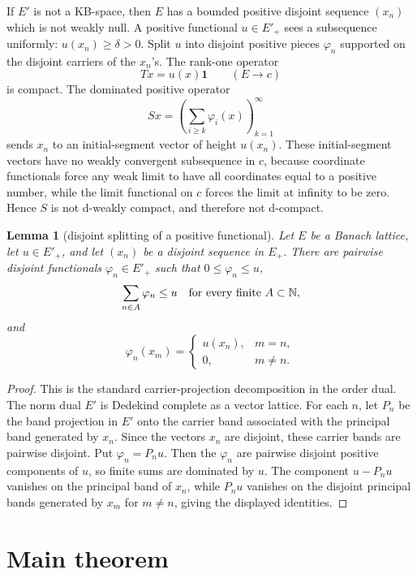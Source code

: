 \documentclass[11pt]{amsart}
\newtheorem{lemma}{Lemma}
\theoremstyle{remark}
\newcommand{\N}{\mathbb N}
\begin{document}
If $E'$ is not a KB-space, then $E$ has a bounded positive disjoint sequence
$(x_n)$ which is not weakly null.  A positive functional $u\in E'_+$ sees a
subsequence uniformly: $u(x_n)\ge\delta>0$.  Split $u$ into disjoint positive
pieces $\varphi_n$ supported on the disjoint carriers of the $x_n$'s.  The
rank-one operator
\[
        Tx=u(x)\mathbf 1 \qquad (E\to c)
\]
is compact.  The dominated positive operator
\[
        Sx=\left(\sum_{i\ge k}\varphi_i(x)\right)_{k=1}^\infty
\]
sends $x_n$ to an initial-segment vector of height $u(x_n)$.  These
initial-segment vectors have no weakly convergent subsequence in $c$, because
coordinate functionals force any weak limit to have all coordinates equal to a
positive number, while the limit functional on $c$ forces the limit at infinity
to be zero.  Hence $S$ is not d-weakly compact, and therefore not d-compact.

\begin{lemma}[disjoint splitting of a positive functional]\label{lem:split}
Let $E$ be a Banach lattice, let $u\in E'_+$, and let $(x_n)$ be a disjoint
sequence in $E_+$.  There are pairwise disjoint functionals
$\varphi_n\in E'_+$ such that $0\le \varphi_n\le u$,
\[
        \sum_{n\in A}\varphi_n\le u
        \quad\hbox{for every finite }A\subset\N,
\]
and
\[
        \varphi_n(x_m)=
        \begin{cases}
        u(x_n), & m=n,\\
        0, & m\ne n.
        \end{cases}
\]
\end{lemma}

\begin{proof}
This is the standard carrier-projection decomposition in the order dual.  The
norm dual $E'$ is Dedekind complete as a vector lattice.  For each $n$, let
$P_n$ be the band projection in $E'$ onto the carrier band associated with the
principal band generated by $x_n$.  Since the vectors $x_n$ are disjoint, these
carrier bands are pairwise disjoint.  Put $\varphi_n=P_nu$.  Then the
$\varphi_n$ are pairwise disjoint positive components of $u$, so finite sums
are dominated by $u$.  The component $u-P_nu$ vanishes on the principal band of
$x_n$, while $P_nu$ vanishes on the disjoint principal bands generated by
$x_m$ for $m\ne n$, giving the displayed identities.
\end{proof}

\section*{Main theorem}
\end{document}
